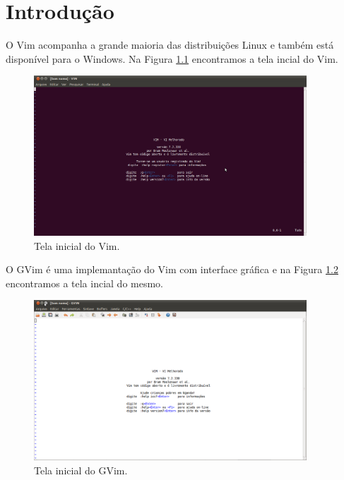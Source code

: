 % 
% 
% 
% 
% 
\chapter{Introdução} \label{sch:vim:basic}
O Vim acompanha a grande maioria das distribuições Linux e também está disponível para o Windows. Na Figura \ref{fig:vim_screen} encontramos a tela incial do Vim.
\begin{figure}[h!]
    \centering
    \includegraphics[height=6cm]{figures/vim_screen}
    \caption{Tela inicial do Vim.}
    \label{fig:vim_screen}
\end{figure}

O GVim é uma implemantação do Vim com interface gráfica e na Figura \ref{fig:gvim_screen} encontramos a tela incial do mesmo.
\begin{figure}[h!]
    \centering
    \includegraphics[height=6cm]{figures/gvim_screen}
    \caption{Tela inicial do GVim.}
    \label{fig:gvim_screen}
\end{figure}


